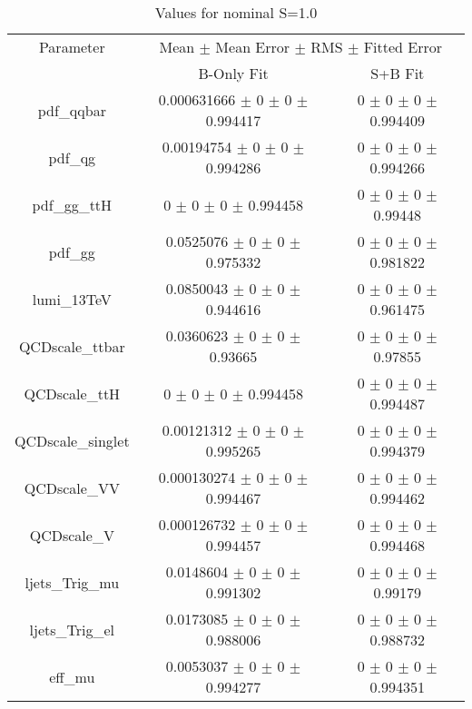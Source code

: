 \begin{table}
\centering
\caption{Values for nominal S=1.0}
\begin{tabular}{ccc}
\toprule
Parameter & \multicolumn{2}{c}{Mean $\pm$ Mean Error $\pm$ RMS $\pm$ Fitted Error}\\
 & B-Only Fit & S+B Fit\\
\midrule
pdf\_qqbar & \num{0.000631666} $\pm$ \num{0} $\pm$ \num{0} $\pm$ \num{0.994417} & \num{0} $\pm$ \num{0} $\pm$ \num{0} $\pm$ \num{0.994409}\\
pdf\_qg & \num{0.00194754} $\pm$ \num{0} $\pm$ \num{0} $\pm$ \num{0.994286} & \num{0} $\pm$ \num{0} $\pm$ \num{0} $\pm$ \num{0.994266}\\
pdf\_gg\_ttH & \num{0} $\pm$ \num{0} $\pm$ \num{0} $\pm$ \num{0.994458} & \num{0} $\pm$ \num{0} $\pm$ \num{0} $\pm$ \num{0.99448}\\
pdf\_gg & \num{0.0525076} $\pm$ \num{0} $\pm$ \num{0} $\pm$ \num{0.975332} & \num{0} $\pm$ \num{0} $\pm$ \num{0} $\pm$ \num{0.981822}\\
lumi\_13TeV & \num{0.0850043} $\pm$ \num{0} $\pm$ \num{0} $\pm$ \num{0.944616} & \num{0} $\pm$ \num{0} $\pm$ \num{0} $\pm$ \num{0.961475}\\
QCDscale\_ttbar & \num{0.0360623} $\pm$ \num{0} $\pm$ \num{0} $\pm$ \num{0.93665} & \num{0} $\pm$ \num{0} $\pm$ \num{0} $\pm$ \num{0.97855}\\
QCDscale\_ttH & \num{0} $\pm$ \num{0} $\pm$ \num{0} $\pm$ \num{0.994458} & \num{0} $\pm$ \num{0} $\pm$ \num{0} $\pm$ \num{0.994487}\\
QCDscale\_singlet & \num{0.00121312} $\pm$ \num{0} $\pm$ \num{0} $\pm$ \num{0.995265} & \num{0} $\pm$ \num{0} $\pm$ \num{0} $\pm$ \num{0.994379}\\
QCDscale\_VV & \num{0.000130274} $\pm$ \num{0} $\pm$ \num{0} $\pm$ \num{0.994467} & \num{0} $\pm$ \num{0} $\pm$ \num{0} $\pm$ \num{0.994462}\\
QCDscale\_V & \num{0.000126732} $\pm$ \num{0} $\pm$ \num{0} $\pm$ \num{0.994457} & \num{0} $\pm$ \num{0} $\pm$ \num{0} $\pm$ \num{0.994468}\\
ljets\_Trig\_mu & \num{0.0148604} $\pm$ \num{0} $\pm$ \num{0} $\pm$ \num{0.991302} & \num{0} $\pm$ \num{0} $\pm$ \num{0} $\pm$ \num{0.99179}\\
ljets\_Trig\_el & \num{0.0173085} $\pm$ \num{0} $\pm$ \num{0} $\pm$ \num{0.988006} & \num{0} $\pm$ \num{0} $\pm$ \num{0} $\pm$ \num{0.988732}\\
eff\_mu & \num{0.0053037} $\pm$ \num{0} $\pm$ \num{0} $\pm$ \num{0.994277} & \num{0} $\pm$ \num{0} $\pm$ \num{0} $\pm$ \num{0.994351}\\

\end{tabular}
\end{table}
